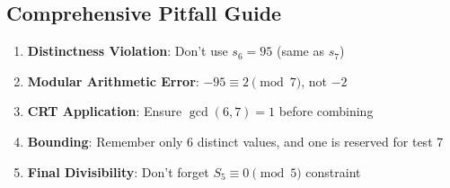 \documentclass[11pt]{article}
\begin{document}
\begin{solutionbox}
\subsection*{Comprehensive Pitfall Guide}
\begin{enumerate}
    \item \textbf{Distinctness Violation}: Don't use $s_6 = 95$ (same as $s_7$)
    \item \textbf{Modular Arithmetic Error}: $-95 \equiv 2 \pmod{7}$, not $-2$
    \item \textbf{CRT Application}: Ensure $\gcd(6, 7) = 1$ before combining
    \item \textbf{Bounding}: Remember only 6 distinct values, and one is reserved for test 7
    \item \textbf{Final Divisibility}: Don't forget $S_5 \equiv 0 \pmod{5}$ constraint
\end{enumerate}
\end{solutionbox}
\end{document}
